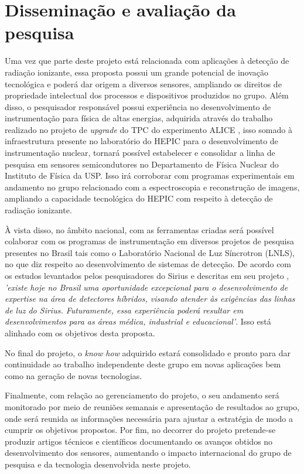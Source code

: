 \chapter{Disseminação e avaliação da pesquisa}

Uma vez que parte deste projeto está relacionada com aplicações à detecção de radiação ionizante, essa proposta possui um grande potencial de inovação tecnológica e poderá dar origem a diversos sensores, ampliando os direitos de propriedade intelectual dos processos e dispositivos produzidos no grupo. Além disso, o pesquisador responsável possui experiência no desenvolvimento de instrumentação para física de altas energias, adquirida através do trabalho realizado no projeto de {\it upgrade} do TPC do experimento ALICE \cite{tpcNIM}, isso somado à infraestrutura presente no laboratório do HEPIC para o desenvolvimento de instrumentação nuclear, tornará possível estabelecer e consolidar a linha de pesquisa em sensores semicondutores no Departamento de Física Nuclear do Instituto de Física da USP. Isso irá corroborar com programas experimentais em andamento no grupo relacionado com a espectroscopia e reconstrução de imagens\cite{THGEM,NIM,xray}, ampliando a capacidade tecnológica do HEPIC com respeito à detecção de radiação ionizante. 

À vista disso, no âmbito nacional, com as ferramentas criadas será possível colaborar com os programas de instrumentação em diversos projetos de pesquisa presentes no Brasil tais como o Laboratório Nacional de Luz Síncrotron (LNLS), no que diz respeito ao desenvolvimento de sistemas de detecção. De acordo com os estudos levantados pelos pesquisadores do Sirius e descritas em seu projeto \cite{sirius}, {\it 'existe hoje no Brasil uma oportunidade excepcional para o desenvolvimento de expertise na área de detectores híbridos, visando atender às exigências das linhas de luz do Sirius. Futuramente, essa experiência poderá resultar em desenvolvimentos para as áreas médica, industrial e educacional'}. Isso está alinhado com os objetivos desta proposta.

No final do projeto, o {\it know how} adquirido estará consolidado e pronto para dar continuidade ao trabalho independente deste grupo em novas aplicações bem como na geração de novas tecnologias.

Finalmente, com relação ao gerenciamento do projeto, o seu andamento será monitorado por meio de reuniões semanais e apresentação de resultados ao grupo, onde será reunida as informações necessária para ajustar a estratégia de modo a cumprir os objetivos propostos. Por fim, no decorrer do projeto pretende-se produzir artigos técnicos e científicos documentando os avanços obtidos no desenvolvimento dos sensores, aumentando o impacto internacional do grupo de pesquisa e da tecnologia desenvolvida neste projeto.


